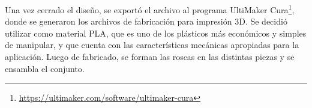 Una vez cerrado el diseño, se exportó el archivo al programa UltiMaker Cura\footnote{\url{https://ultimaker.com/software/ultimaker-cura}}, donde se generaron los archivos de fabricación para impresión 3D. Se decidió utilizar como material PLA, que es uno de los plásticos más económicos y simples de manipular, y que cuenta con las características mecánicas apropiadas para la aplicación. Luego de fabricado, se forman las roscas en las distintas piezas y se ensambla el conjunto.